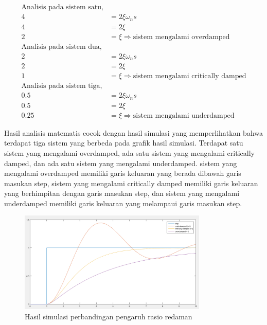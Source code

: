 \documentclass[../laporan]{subfiles}
\begin{document}
\begin{equation*}
\label{persamaan_orde_dua}
    \begin{split}
        \text{Analisis pada sistem satu,}\\
        4 &= 2\xi\omega_ns \\[5pt]
        4 &= 2\xi \\[5pt]
        2 &= \xi \Rightarrow \text{sistem mengalami overdamped} \\[5pt]
        \text{Analisis pada sistem dua,}\\
        2 &= 2\xi\omega_ns \\[5pt]
        2 &= 2\xi \\[5pt]
        1 &= \xi \Rightarrow \text{sistem mengalami critically damped} \\[5pt]
        \text{Analisis pada sistem tiga,}\\
        0.5 &= 2\xi\omega_ns \\[5pt]
        0.5 &= 2\xi \\[5pt]
        0.25 &= \xi \Rightarrow \text{sistem mengalami underdamped}
    \end{split}
\end{equation*}

Hasil analisis matematis cocok dengan hasil simulasi yang memperlihatkan bahwa terdapat tiga sistem yang berbeda pada grafik hasil simulasi. Terdapat satu sistem yang mengalami overdamped, ada satu sistem yang mengalami critically damped, dan ada satu sistem yang mengalami underdamped. sistem yang mengalami overdamped memiliki garis keluaran yang berada dibawah garis masukan step, sistem yang mengalami critically damped memiliki garis keluaran yang berhimpitan dengan garis masukan step, dan sistem yang mengalami underdamped memiliki garis keluaran yang melampaui garis masukan step.

\begin{figure}[H]
    \centering
    \includegraphics[width = 0.8\textwidth]{figure/hasil_1_b.png}
    \caption{Hasil simulasi perbandingan pengaruh rasio redaman}
    \label{hasil_1_b}
\end{figure}
\end{document}
